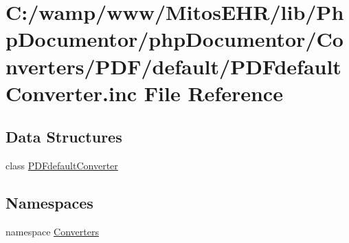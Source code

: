\hypertarget{_p_d_fdefault_converter_8inc}{\section{\-C\-:/wamp/www/\-Mitos\-E\-H\-R/lib/\-Php\-Documentor/php\-Documentor/\-Converters/\-P\-D\-F/default/\-P\-D\-Fdefault\-Converter.inc \-File \-Reference}
\label{_p_d_fdefault_converter_8inc}
}
\subsection*{\-Data \-Structures}
\begin{DoxyCompactItemize}
\item 
class \hyperlink{class_p_d_fdefault_converter}{\-P\-D\-Fdefault\-Converter}
\end{DoxyCompactItemize}
\subsection*{\-Namespaces}
\begin{DoxyCompactItemize}
\item 
namespace \hyperlink{namespace_converters}{\-Converters}
\end{DoxyCompactItemize}
